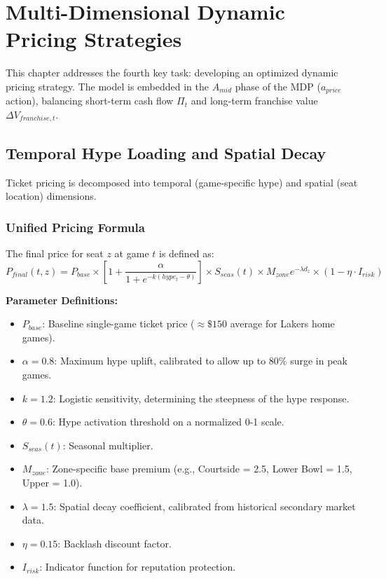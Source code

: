 \documentclass[12pt]{article}
\begin{document}
\section{Multi-Dimensional Dynamic Pricing Strategies}

This chapter addresses the fourth key task: developing an optimized dynamic pricing strategy. The model is embedded in the $A_{mid}$ phase of the MDP ($a_{price}$ action), balancing short-term cash flow $\Pi_t$ and long-term franchise value $\Delta V_{franchise,t}$.

\subsection{Temporal Hype Loading and Spatial Decay}
Ticket pricing is decomposed into temporal (game-specific hype) and spatial (seat location) dimensions.

\subsubsection{Unified Pricing Formula}
The final price for seat $z$ at game $t$ is defined as:
\begin{equation}
P_{final}(t,z) = P_{base} \times \left[ 1 + \frac{\alpha}{1 + e^{-k(hype_t - \theta)}} \right] \times S_{seas}(t) \times M_{zone} e^{-\lambda d_z} \times (1 - \eta \cdot I_{risk})
\end{equation}

\textbf{Parameter Definitions:}
\begin{itemize}
    \item $P_{base}$: Baseline single-game ticket price ($\approx \$150$ average for Lakers home games).
    \item $\alpha = 0.8$: Maximum hype uplift, calibrated to allow up to 80\% surge in peak games.
    \item $k = 1.2$: Logistic sensitivity, determining the steepness of the hype response.
    \item $\theta = 0.6$: Hype activation threshold on a normalized 0-1 scale.
    \item $S_{seas}(t)$: Seasonal multiplier.
    \item $M_{zone}$: Zone-specific base premium (e.g., Courtside = 2.5, Lower Bowl = 1.5, Upper = 1.0).
    \item $\lambda = 1.5$: Spatial decay coefficient, calibrated from historical secondary market data.
    \item $\eta = 0.15$: Backlash discount factor.
    \item $I_{risk}$: Indicator function for reputation protection.
\end{itemize}
\end{document}
